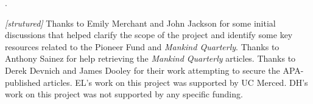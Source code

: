 \documentclass[12pt]{article}
\newcounter{lastnote}
\newenvironment{scilastnote}{%
\setcounter{lastnote}{\value{enumiv}}%
\addtocounter{lastnote}{+1}%
\begin{list}%
{\arabic{lastnote}.}
{\setlength{\leftmargin}{.22in}}
{\setlength{\labelsep}{.5em}}}
{\end{list}}
\begin{document}

\begin{scilastnote}
\item \emph{{[}strutured{]}} Thanks to Emily Merchant and John Jackson for some initial discussions that helped clarify the scope of the project and identify some key resources related to the Pioneer Fund and \emph{Mankind Quarterly}. Thanks to Anthony Sainez for help retrieving the \emph{Mankind Quarterly} articles. Thanks to Derek Devnich and James Dooley for their work attempting to secure the APA-published articles. EL's work on this project was supported by UC Merced. DH's work on this project was not supported by any specific funding.
\end{scilastnote}


\renewcommand{\thetable}{\arabic{table}}
\renewcommand{\thefigure}{\arabic{figure}}
\setcounter{table}{0}
\setcounter{figure}{0}









\end{document}
